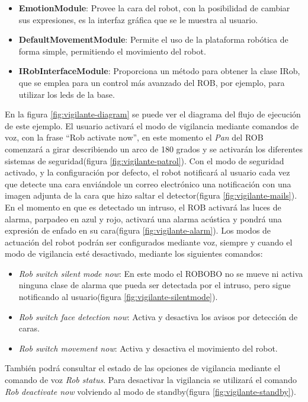 \begin{itemize}
	\item \textbf{EmotionModule}: Provee la cara del robot, con la posibilidad de cambiar sus expresiones, es la interfaz gráfica que se le muestra al usuario.
	\item \textbf{DefaultMovementModule}: Permite el uso de la plataforma robótica de forma simple, permitiendo el movimiento del robot.
	\item \textbf{IRobInterfaceModule}: Proporciona un método para obtener la clase IRob, que se emplea para un control más avanzado del ROB, por ejemplo, para utilizar los leds de la base.
\end{itemize}
En la figura \ref{fig:vigilante-diagram} se puede ver el diagrama del flujo de ejecución de este ejemplo.
El usuario activará el modo de vigilancia mediante comandos de voz, con la frase \enquote{Rob activate now}, en este momento el \textit{Pan} del ROB comenzará a girar describiendo un arco de 180 grados y se activarán los diferentes sistemas de seguridad(figura \ref{fig:vigilante-patrol}).
Con el modo de seguridad activado, y la configuración por defecto, el  robot notificará al usuario cada vez que detecte una cara enviándole un correo electrónico una notificación con una imagen adjunta de la cara que hizo saltar el detector(figura \ref{fig:vigilante-mails}).
En el momento en que es detectado un intruso, el ROB activará las luces de alarma, parpadeo en azul y rojo, activará una alarma acústica y pondrá una expresión de enfado en su cara(figura \ref{fig:vigilante-alarm}).
Los modos de actuación del robot podrán ser configurados mediante voz, siempre y cuando el modo de vigilancia esté desactivado, mediante los siguientes comandos:
\begin{itemize}
	\item \textit{Rob switch silent mode now}: En este modo el ROBOBO no se mueve ni activa ninguna clase de alarma que pueda ser detectada por el intruso, pero sigue notificando al usuario(figura \ref{fig:vigilante-silentmode}).
	\item \textit{Rob switch face detection now}: Activa y desactiva los avisos por detección de caras.
	\item \textit{Rob switch movement now}: Activa y desactiva el movimiento del robot.
\end{itemize}
También podrá consultar el estado de las opciones de vigilancia mediante el comando de voz \textit{Rob status}.
Para desactivar la vigilancia se utilizará el comando \textit{Rob deactivate now} volviendo al modo de standby(figura \ref{fig:vigilante-standby}).


